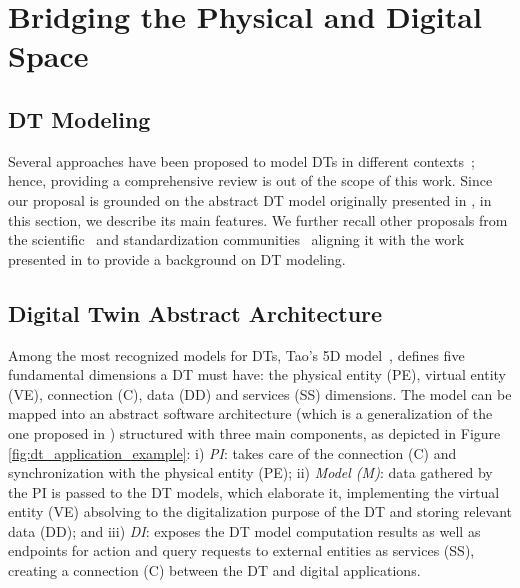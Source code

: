 \section{Bridging the Physical and Digital Space}

\subsection{\acl{DT} Modeling}
\label{sec:dt_modeling}

Several approaches have been proposed to model \acp{DT} in different contexts~\cite{tao2022modeling}; hence, providing a comprehensive review is out of the scope of this work.
%
Since our proposal is grounded on the abstract \ac{DT} model originally presented in \cite{web-of-dt-ricci-2022}, in this section, we describe its main features.
%
We further recall other proposals from the scientific~\cite{dt-driven-prognostics-tao-2018,qi2021enablingtechdt,requirements-patterns-dt-industry-bellavista-2023} and standardization communities~\cite{etsi-dt-comm-requirements-2024} 
aligning it with the work presented in \cite{web-of-dt-ricci-2022} to provide a background on \ac{DT} modeling.


\subsection{Digital Twin Abstract Architecture}

Among the most recognized models for \acp{DT}, Tao's 5D model~\cite{qi2021enablingtechdt},
defines five fundamental dimensions a \ac{DT} must have: the physical entity (PE), virtual entity (VE), connection (C), data (DD) and services (SS) dimensions.
The model can be mapped into an abstract software architecture (which is a generalization of the one proposed in \cite{web-of-dt-ricci-2022})
structured with three main components, as depicted in Figure \ref{fig:dt_application_example}: i) \emph{\ac{PI}}: takes care of the connection (C) and synchronization with the physical entity (PE); ii) \emph{Model (M)}: data gathered by the PI is passed to the \ac{DT} models, which elaborate it, implementing the virtual entity (VE) absolving to the digitalization purpose of the \ac{DT} and storing relevant data (DD); and iii) \emph{\ac{DI}}: exposes the \ac{DT} model computation results as well as endpoints for action and query requests to external entities as services (SS), creating a connection (C) between the \ac{DT} and digital applications.

